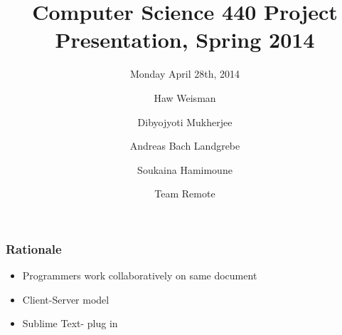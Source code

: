 \documentclass{beamer}
\title[Crisis] %
{Computer Science 440 Project Presentation, Spring 2014}
\subtitle{Monday April 28th, 2014}
\author[Hawk Weisman, Dibyojyoti Mukherjee, Andreas Bach Landgrebe, Soukaina Hamimoune] %
{Haw Weisman\inst{1} \and Dibyojyoti Mukherjee\inst{1}\\ \and Andreas Bach Landgrebe\inst{1} \and Soukaina Hamimoune\inst{2}}
\institute[Allegheny College, Department of Computer Science] %
{
  \inst{1}%
  Allgheny College\\
  Department of Computer Science
  \and
  \inst{2}%
  Al Akhawayn University\\
  Department of Computer Science
}
\date[April 28, 2014] %
{Team Remote}
\begin{document}
\frame{\titlepage}

\begin{frame}
\frametitle{Rationale}
\begin{itemize}
\item Programmers work collaboratively on same document
\item Client-Server model
\item Sublime Text- plug in
\end{itemize}

\end{frame}
\end{document}
